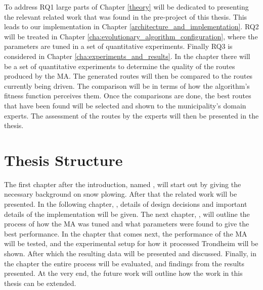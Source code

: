 To address RQ1 large parts of Chapter \ref{theory} will be dedicated to presenting the relevant related work that was found in the pre-project of this thesis. This leads to our implementation in Chapter \ref{architecture_and_implementation}. RQ2 will be treated in Chapter \ref{cha:evolutionary_algorithm_configuration}, where the parameters are tuned in a set of quantitative experiments. Finally RQ3 is considered in Chapter \ref{cha:experiments_and_results}. In the chapter there will be a set of quantitative experiments to determine the quality of the routes produced by the MA. The generated routes will then be compared to the routes currently being driven. The comparison will be in terms of how the algorithm's fitness function perceives them. Once the comparisons are done, the best routes that have been found will be selected and shown to the municipality's domain experts. The assessment of the routes by the experts will then be presented in the thesis.

\section{Thesis Structure}

The first chapter after the introduction, named , will start out by giving the necessary background on snow plowing. After that the related work will be presented. In the following chapter, , details of design decisions and important details of the implementation will be given. The next chapter, , will outline the process of how the MA was tuned and what parameters were found to give the best performance. In the  chapter that comes next, the performance of the MA will be tested, and the experimental setup for how it processed Trondheim will be shown. After which the resulting data will be presented and discussed. Finally, in the  chapter the entire process will be evaluated, and findings from the results presented. At the very end, the future work will outline how the work in this thesis can be extended.

\cleardoublepage
